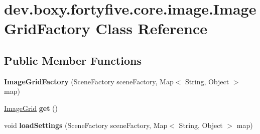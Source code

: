\hypertarget{classdev_1_1boxy_1_1fortyfive_1_1core_1_1image_1_1_image_grid_factory}{
\section{dev.boxy.fortyfive.core.image.ImageGridFactory Class Reference}
\label{da/dec/classdev_1_1boxy_1_1fortyfive_1_1core_1_1image_1_1_image_grid_factory}
}
\subsection*{Public Member Functions}
\begin{DoxyCompactItemize}
\item 
\hypertarget{classdev_1_1boxy_1_1fortyfive_1_1core_1_1image_1_1_image_grid_factory_adb26173d46e7bc1eb4b6886e8b8876d8}{
{\bfseries ImageGridFactory} (SceneFactory sceneFactory, Map$<$ String, Object $>$ map)}
\label{da/dec/classdev_1_1boxy_1_1fortyfive_1_1core_1_1image_1_1_image_grid_factory_adb26173d46e7bc1eb4b6886e8b8876d8}

\item 
\hypertarget{classdev_1_1boxy_1_1fortyfive_1_1core_1_1image_1_1_image_grid_factory_a42071199ac5ea0819ff82c6891e32dff}{
\hyperlink{classdev_1_1boxy_1_1fortyfive_1_1core_1_1image_1_1_image_grid}{ImageGrid} {\bfseries get} ()}
\label{da/dec/classdev_1_1boxy_1_1fortyfive_1_1core_1_1image_1_1_image_grid_factory_a42071199ac5ea0819ff82c6891e32dff}

\item 
\hypertarget{classdev_1_1boxy_1_1fortyfive_1_1core_1_1image_1_1_image_grid_factory_a84478b8ed0043528f53aae0dbc84be88}{
void {\bfseries loadSettings} (SceneFactory sceneFactory, Map$<$ String, Object $>$ map)}
\label{da/dec/classdev_1_1boxy_1_1fortyfive_1_1core_1_1image_1_1_image_grid_factory_a84478b8ed0043528f53aae0dbc84be88}

\end{DoxyCompactItemize}
